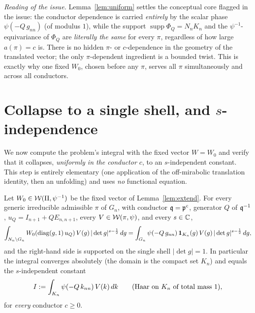 \noindent\emph{Reading of the issue.} Lemma~\ref{lem:uniform} settles the conceptual core flagged
in the issue: the conductor dependence is carried \emph{entirely} by the scalar phase
$\psi(-Q\,g_{nn})$ \textup{(}of modulus $1$\textup{)}, while the support
$\operatorname{supp}\Phi_Q=N_nK_n$ and the $\psi^{-1}$-equivariance of $\Phi_Q$ are
\emph{literally the same} for every $\pi$, regardless of how large $a(\pi)=c$ is. There is no
hidden $\pi$- or $c$-dependence in the geometry of the translated vector; the only $\pi$-dependent
ingredient is a bounded twist. This is exactly why one fixed $W_0$, chosen before any $\pi$,
serves all $\pi$ simultaneously and across all conductors.

\section*{Collapse to a single shell, and $s$-independence}

We now compute the problem's integral with the fixed vector $W=W_0$ and verify that it
collapses, \emph{uniformly in the conductor $c$}, to an $s$-independent constant. This step is
entirely elementary \textup{(}one application of the off-mirabolic translation identity, then an
unfolding\textup{)} and uses \emph{no} functional equation.

\begin{qtwolemma}\label{lem:unfold}
Let $W_0\in\mathcal{W}(\Pi,\psi^{-1})$ be the fixed vector of Lemma~\ref{lem:extend}. For every
generic irreducible admissible $\pi$ of $G_n$, with conductor $\mathfrak{q}=\mathfrak{p}^{c}$, generator
$Q$ of $\mathfrak{q}^{-1}$, $u_Q=I_{n+1}+QE_{n,n+1}$, every $V\in\mathcal{W}(\pi,\psi)$, and every
$s\in\mathbb{C}$,
\[
\int_{N_n\backslash G_n} W_0(\operatorname{diag}(g,1)\,u_Q)\,V(g)\,|\det g|^{s-\frac12}\,dg
=\int_{G_n}\psi(-Q\,g_{nn})\,\mathbf 1_{K_n}(g)\,V(g)\,|\det g|^{s-\frac12}\,dg ,
\]
and the right-hand side is supported on the single shell $|\det g|=1$. In particular the
integral converges absolutely \textup{(}the domain is the compact set $K_n$\textup{)} and equals
the $s$-independent constant
\begin{equation}\label{eq:Idef}
I:=\int_{K_n}\psi(-Q\,k_{nn})\,V(k)\,dk\qquad\textup{(Haar on $K_n$ of total mass $1$),}
\end{equation}
for \emph{every} conductor $c\ge0$.
\end{qtwolemma}


